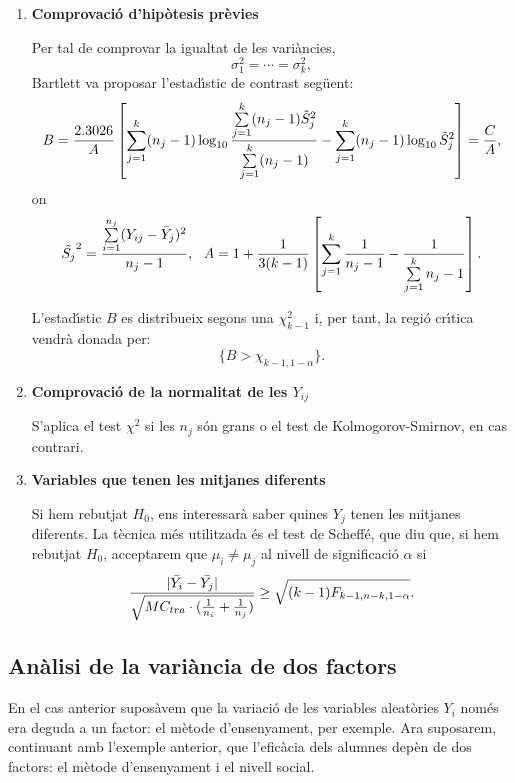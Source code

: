 \begin{enumerate}
\item {\bf Comprovaci\'o d'hip\`otesis pr\`evies}

Per tal de comprovar la igualtat de les vari\`ancies,
$$\sigma_1^2 = \cdots = \sigma_k^2,$$
Bartlett va proposar l'estad\'{\i}stic de contrast seg\"uent:
$$B = {2.3026 \over A} \left[ \sum\limits_{j=1}^k (n_j - 1) \log_{10}
{\sum\limits_{j=1}^k (n_j - 1) \tilde{S}_j^2 \over \sum\limits_{j=1}^k (n_j - 1)}
- \sum\limits_{j=1}^k (n_j - 1) \log_{10} \tilde{S}_j^2 \right] = {C \over A},$$
on
$$\tilde{S_j}^2 = {\sum\limits_{i=1}^{n_j} (Y_{ij} - \bar{Y}_j)^2 \over n_j - 1},
\ \ A = 1 + {1 \over 3 (k-1)} \left[ \sum\limits_{j=1}^k {1 \over n_j - 1} - {1
\over \sum\limits_{j=1}^k n_j - 1} \right].$$

L'estad\'{\i}stic $B$ es distribueix segons una $\chi_{k-1}^2$ i, per tant, la regi\'o
cr\'{\i}tica vendr\`a donada per:
$$\{ B > \chi_{k-1,1-\alpha} \}.$$

\item {\bf Comprovaci\'o de la normalitat de les $Y_{ij}$}

S'aplica el test $\chi^2$ si les $n_j$ s\'on grans o el test de Kolmogorov-Smirnov,
en cas contrari.

\item {\bf Variables que tenen les mitjanes diferents}

Si hem rebutjat $H_0$, ens interessar\`a saber quines $Y_j$ tenen les mitjanes
diferents. La t\`ecnica m\'es utilitzada \'es el test de Scheff\'e, 
que diu que, si hem
rebutjat $H_0$, acceptarem que $\mu_i \not = \mu_j$ al nivell de significaci\'o
$\alpha$ si
$${|\bar{Y_i} - \bar{Y_j}| \over \sqrt{MC_{tra} \cdot ({1 \over n_i} + {1 \over
n_j})}} \geq \sqrt{(k-1) F_{k-1,n-k,1-\alpha}}.$$
\end{enumerate}

\subsection{An\`alisi de la vari\`ancia de dos factors}

En el cas anterior supos\`avem que la variaci\'o de les variables aleat\`ories $Y_i$
nom\'es era deguda a un factor: el m\`etode d'ensenyament, 
per exemple. Ara
suposarem, continuant amb l'exemple anterior, que l'efic\`acia
 dels alumnes dep\`en de
dos factors: el m\`etode d'ensenyament i el nivell social.

